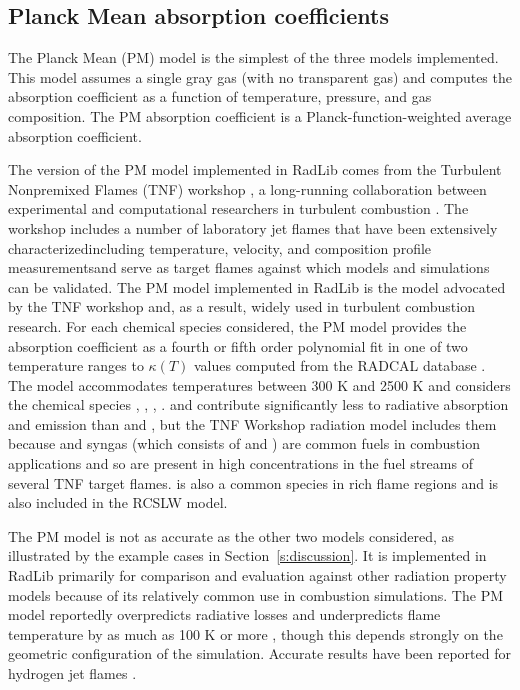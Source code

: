 \documentclass[preprint,12pt]{elsarticle}
\begin{document}
\subsection{Planck Mean absorption coefficients} \label{s:planckmean}

The Planck Mean (PM) model is the simplest of the three models implemented. This model assumes a single gray gas (with no transparent gas) and computes the absorption coefficient as a function of temperature, pressure, and gas composition. The PM absorption coefficient is a Planck-function-weighted average absorption coefficient.

The version of the PM model implemented in RadLib comes from the Turbulent Nonpremixed Flames (TNF) workshop \cite{TNF}, a long-running collaboration between experimental and computational researchers in turbulent combustion \citep{Smith_2003,Barlow_2001}. The workshop includes a number of laboratory jet flames that have been extensively characterized\textemdash including temperature, velocity, and composition profile measurements\textemdash and serve as target flames against which models and simulations can be validated. 
The PM model implemented in RadLib is the model advocated by the TNF workshop and, as a result, widely used in turbulent combustion research.
For each chemical species considered, the PM model provides the absorption coefficient as a fourth or fifth order polynomial fit in one of two temperature ranges to $\kappa(T)$ values computed from the RADCAL database \cite{Grosshandler_1993}.
The model accommodates temperatures between 300 K and 2500 K and considers the chemical species , , , .
 and  contribute significantly less to radiative absorption and emission than  and , but the TNF Workshop radiation model includes them because  and syngas (which consists of  and ) are common fuels in combustion applications and so are present in high concentrations in the fuel streams of several TNF target flames.  is also a common species in rich flame regions and is also included in the RCSLW model.

The PM model is not as accurate as the other two models considered, as illustrated by the example cases in Section~\ref{s:discussion}.
It is implemented in RadLib primarily for comparison and evaluation against other radiation property models because of its relatively common use in combustion simulations.
The PM model reportedly overpredicts radiative losses and underpredicts flame temperature by as much as 100 K or more \cite{Frank_2000,Zhu_2002,Coelho_2002}, though this depends strongly on the geometric configuration of the simulation.
Accurate results have been reported for hydrogen jet flames \cite{Barlow_1999}.
\end{document}
